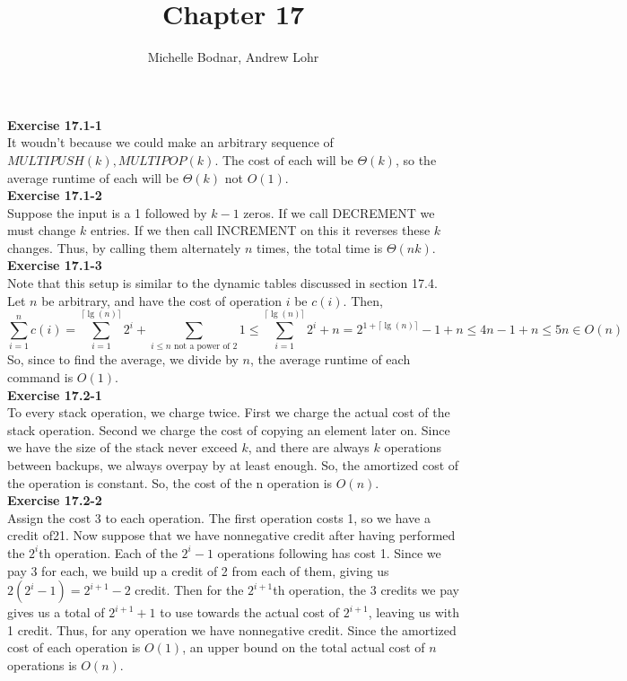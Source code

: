 \documentclass{article}
\title{Chapter 17}
\author{Michelle Bodnar, Andrew Lohr}
\begin{document}
\maketitle


\noindent\textbf{Exercise 17.1-1}\\

It woudn't because we could make an arbitrary sequence of $MULTIPUSH(k), MULTIPOP(k)$. The cost of each will be $\Theta(k)$, so the average runtime of each will be $\Theta(k)$ not $O(1)$.\\

\noindent\textbf{Exercise 17.1-2}\\

Suppose the input is a 1 followed by $k-1$ zeros.  If we call DECREMENT we must change $k$ entries.  If we then call INCREMENT on this it reverses these $k$ changes.  Thus, by calling them alternately $n$ times, the total time is $\Theta(nk)$.\\

\noindent\textbf{Exercise 17.1-3}\\

Note that this setup is similar to the dynamic tables discussed in section 17.4. Let $n$ be arbitrary, and have the cost of operation $i$ be $c(i)$. Then,
\[
\sum_{i=1}^n c(i) = \sum_{i=1}^{\lceil\lg(n)\rceil} 2^i + \sum_{i\le n \mbox{ not a power of 2}} 1 \le \sum_{i=1}^{\lceil\lg(n)\rceil} 2^i + n = 2^{1 + \lceil\lg(n)\rceil} -1 + n \le 4n -1 +n \le 5n \in O(n)
\]
So, since to find the average, we divide by $n$, the average runtime of each command is $O(1)$.\\

\noindent\textbf{Exercise 17.2-1}\\

To every stack operation, we charge twice. First we charge the actual cost of the stack operation. Second we charge the cost of copying an element later on. Since we have the size of the stack never exceed $k$, and there are always $k$ operations between backups, we always overpay by at least enough. So, the amortized cost of the operation is constant. So, the cost of the n operation is $O(n)$.\\

\noindent\textbf{Exercise 17.2-2}\\

Assign the cost 3 to each operation. The first operation costs 1, so we have a credit of21.  Now suppose that we have nonnegative credit after having performed the $2^{i}$th operation.  Each of the $2^{i}-1$ operations following has cost 1.  Since we pay 3 for each, we build up a credit of 2 from each of them, giving us $2(2^i-1) = 2^{i+1} - 2$ credit.  Then for the $2^{i+1}$th operation, the 3 credits we pay gives us a total of $2^{i+1} + 1$ to use towards the actual cost of $2^{i+1}$, leaving us with 1 credit.  Thus, for any operation we have nonnegative credit.  Since the amortized cost of each operation is $O(1)$, an upper bound on the total actual cost of $n$ operations is $O(n)$. \\
\end{document}
